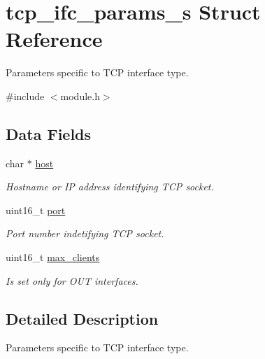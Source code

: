 \hypertarget{structtcp__ifc__params__s}{}\section{tcp\+\_\+ifc\+\_\+params\+\_\+s Struct Reference}
\label{structtcp__ifc__params__s}


Parameters specific to T\+CP interface type.  




{\ttfamily \#include $<$module.\+h$>$}

\subsection*{Data Fields}
\begin{DoxyCompactItemize}
\item 
\mbox{\label{structtcp__ifc__params__s_a5ca7fe265cdfae626d87327c1649c16d}} 
char $\ast$ \hyperlink{structtcp__ifc__params__s_a5ca7fe265cdfae626d87327c1649c16d}{host}
\begin{DoxyCompactList}\small\item\em Hostname or IP address identifying T\+CP socket. \end{DoxyCompactList}\item 
\mbox{\label{structtcp__ifc__params__s_a3f49f1cee4ad6723923df0f0aad69b1e}} 
uint16\+\_\+t \hyperlink{structtcp__ifc__params__s_a3f49f1cee4ad6723923df0f0aad69b1e}{port}
\begin{DoxyCompactList}\small\item\em Port number indetifying T\+CP socket. \end{DoxyCompactList}\item 
uint16\+\_\+t \hyperlink{structtcp__ifc__params__s_a8a7e6e32c2393d4c04698813e70112e3}{max\+\_\+clients}
\begin{DoxyCompactList}\small\item\em Is set only for O\+UT interfaces. \end{DoxyCompactList}\end{DoxyCompactItemize}


\subsection{Detailed Description}
Parameters specific to T\+CP interface type. 

